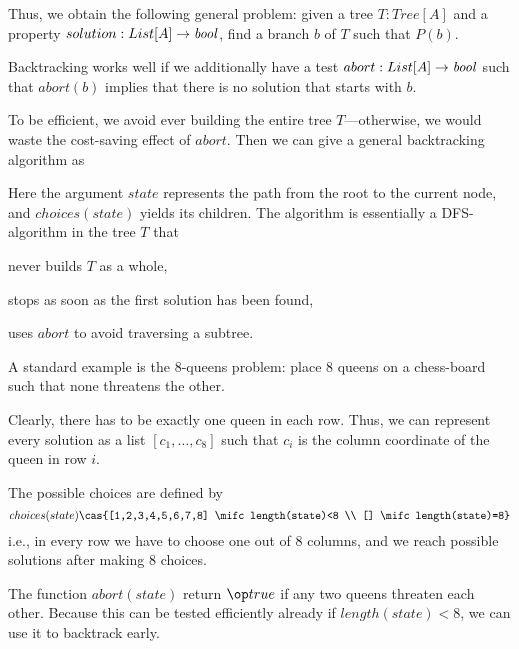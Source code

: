 Thus, we obtain the following general problem: given a tree $T:Tree[A]$ and a property $solution:List[A]\to\mathit{bool}$, find a branch $b$ of $T$ such that $P(b)$.

Backtracking works well if we additionally have a test $abort:List[A]\to\mathit{bool}$ such that $abort(b)$ implies that there is no solution that starts with $b$.

To be efficient, we avoid ever building the entire tree $T$---otherwise, we would waste the cost-saving effect of $abort$.
Then we can give a general backtracking algorithm as
\begin{acode}
\end{acode}

Here the argument $state$ represents the path from the root to the current node, and $choices(state)$ yields its children.
The algorithm is essentially a DFS-algorithm in the tree $T$ that
\begin{compactitem}
 \item never builds $T$ as a whole,
 \item stops as soon as the first solution has been found,
 \item uses $abort$ to avoid traversing a subtree.
\end{compactitem}

\begin{example}
A standard example is the $8$-queens problem: place $8$ queens on a chess-board such that none threatens the other.

Clearly, there has to be exactly one queen in each row.
Thus, we can represent every solution as a list $[c_1,\ldots,c_8]$ such that $c_i$ is the column coordinate of the queen in row $i$.

The possible choices are defined by
\[choices(state) \cas{[1,2,3,4,5,6,7,8] \mifc length(state)<8 \\ [] \mifc length(state)=8}\]
i.e., in every row we have to choose one out of $8$ columns, and we reach possible solutions after making $8$ choices.

The function $abort(state)$ return $\true$ if any two queens threaten each other.
Because this can be tested efficiently already if $length(state)<8$, we can use it to backtrack early.
\end{example}

